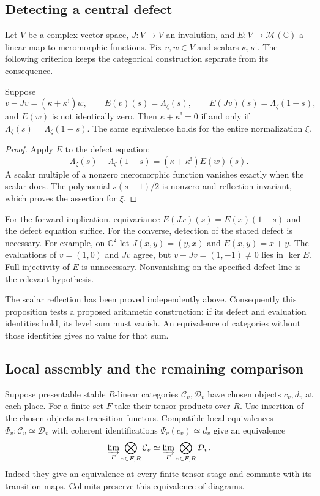 \subsection{Detecting a central defect}

Let $V$ be a complex vector space,
$J:V\to V$ an involution, and
$E:V\to\mathscr M(\mathbb C)$ a
linear map to meromorphic functions.
Fix $v,w\in V$ and scalars
$\kappa,\kappa^!$.
The following criterion keeps the
categorical construction separate
from its consequence.

\begin{proposition}
\label{v4-arith:md:prop:central-defect}
Suppose
\[
 v-Jv=(\kappa+\kappa^!)w,\qquad
 E(v)(s)=\Lambda_\zeta(s),\qquad
 E(Jv)(s)=\Lambda_\zeta(1-s),
\]
and $E(w)$ is not identically zero.
Then $\kappa+\kappa^!=0$ if and
only if
$\Lambda_\zeta(s)=\Lambda_\zeta(1-s)$.
The same equivalence holds for
the entire normalization $\xi$.
\end{proposition}

\begin{proof}
Apply $E$ to the defect equation:
\[
 \Lambda_\zeta(s)-\Lambda_\zeta(1-s)
       =(\kappa+\kappa^!)E(w)(s).
\]
A scalar multiple of a nonzero
meromorphic function vanishes
exactly when the scalar does.
The polynomial $s(s-1)/2$ is
nonzero and reflection invariant,
which proves the assertion for
$\xi$.
\end{proof}

For the forward implication,
equivariance
$E(Jx)(s)=E(x)(1-s)$ and the
defect equation suffice.
For the converse, detection of
the stated defect is necessary.
For example, on $\mathbb C^2$
let $J(x,y)=(y,x)$ and
$E(x,y)=x+y$.
The evaluations of $v=(1,0)$
and $Jv$ agree, but
$v-Jv=(1,-1)\ne0$ lies in
$\ker E$.
Full injectivity of $E$ is
unnecessary. Nonvanishing on
the specified defect line
is the relevant hypothesis.

The scalar reflection has been
proved independently above.
Consequently this proposition
tests a proposed arithmetic
construction: if its defect and
evaluation identities hold,
its level sum must vanish.
An equivalence of categories
without those identities gives
no value for that sum.

\subsection{Local assembly and the remaining comparison}

Suppose presentable stable
$R$-linear categories
$\mathcal C_v,\mathcal D_v$
have chosen objects $c_v,d_v$
at each place.
For a finite set $F$ take
their tensor products over $R$.
Use insertion of the chosen
objects as transition functors.
Compatible local equivalences
$\Psi_v:\mathcal C_v\simeq\mathcal D_v$
with coherent identifications
$\Psi_v(c_v)\simeq d_v$ give
an equivalence
\[
 \varinjlim_F\bigotimes_{v\in F,R}\mathcal C_v
 \simeq
 \varinjlim_F\bigotimes_{v\in F,R}\mathcal D_v.
\]
Indeed they give an equivalence
at every finite tensor stage
and commute with its transition
maps. Colimits preserve this
equivalence of diagrams.

